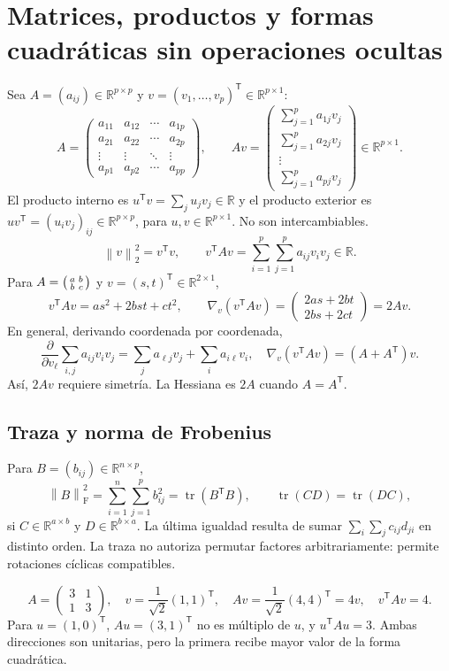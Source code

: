 \documentclass[11pt,a4paper]{article}
\newcommand{\R}{\mathbb R}
\newcommand{\T}{^{\mathsf T}}
\newcommand{\norm}[1]{\left\lVert #1\right\rVert}
\DeclareMathOperator{\tr}{tr}
\newcommand{\F}{_{\mathrm F}}
\theoremstyle{definition}
\begin{document}
\section{Matrices, productos y formas cuadráticas sin operaciones ocultas}
Sea $A=(a_{ij})\in\R^{p\times p}$ y $v=(v_1,\ldots,v_p)\T\in\R^{p\times1}$:
\[
A=\begin{pmatrix}a_{11}&a_{12}&\cdots&a_{1p}\\a_{21}&a_{22}&\cdots&a_{2p}\\\vdots&\vdots&\ddots&\vdots\\a_{p1}&a_{p2}&\cdots&a_{pp}\end{pmatrix},\qquad
Av=\begin{pmatrix}\sum_{j=1}^pa_{1j}v_j\\\sum_{j=1}^pa_{2j}v_j\\\vdots\\\sum_{j=1}^pa_{pj}v_j\end{pmatrix}\in\R^{p\times1}.
\]
El producto interno es $u\T v=\sum_j u_jv_j\in\R$ y el producto exterior es $uv\T=(u_iv_j)_{ij}\in\R^{p\times p}$, para $u,v\in\R^{p\times1}$. No son intercambiables.
\[
\norm v_2^2=v\T v,\qquad v\T Av=\sum_{i=1}^p\sum_{j=1}^pa_{ij}v_iv_j\in\R.
\]
Para $A=\begin{psmallmatrix}a&b\\b&c\end{psmallmatrix}$ y $v=(s,t)\T\in\R^{2\times1}$,
\[
v\T Av=as^2+2bst+ct^2,\qquad
\nabla_v(v\T Av)=\begin{pmatrix}2as+2bt\\2bs+2ct\end{pmatrix}=2Av.
\]
En general, derivando coordenada por coordenada,
\[
\frac{\partial}{\partial v_\ell}\sum_{i,j}a_{ij}v_iv_j
=\sum_j a_{\ell j}v_j+\sum_i a_{i\ell}v_i,
\quad \nabla_v(v\T Av)=(A+A\T)v.
\]
Así, $2Av$ requiere simetría. La Hessiana es $2A$ cuando $A=A\T$.
\subsection{Traza y norma de Frobenius}
Para $B=(b_{ij})\in\R^{n\times p}$,
\[
\norm B\F^2=\sum_{i=1}^n\sum_{j=1}^pb_{ij}^2=\tr(B\T B),\qquad
\tr(CD)=\tr(DC),
\]
si $C\in\R^{a\times b}$ y $D\in\R^{b\times a}$. La última igualdad resulta de sumar $\sum_i\sum_j c_{ij}d_{ji}$ en distinto orden. La traza no autoriza permutar factores arbitrariamente: permite rotaciones cíclicas compatibles.
\begin{ejemplo}
\[
A=\begin{pmatrix}3&1\\1&3\end{pmatrix},\quad
v=\frac1{\sqrt2}(1,1)\T,\quad
Av=\frac1{\sqrt2}(4,4)\T=4v,\quad v\T Av=4.
\]
Para $u=(1,0)\T$, $Au=(3,1)\T$ no es múltiplo de $u$, y $u\T Au=3$. Ambas direcciones son unitarias, pero la primera recibe mayor valor de la forma cuadrática.
\end{ejemplo}
\end{document}
